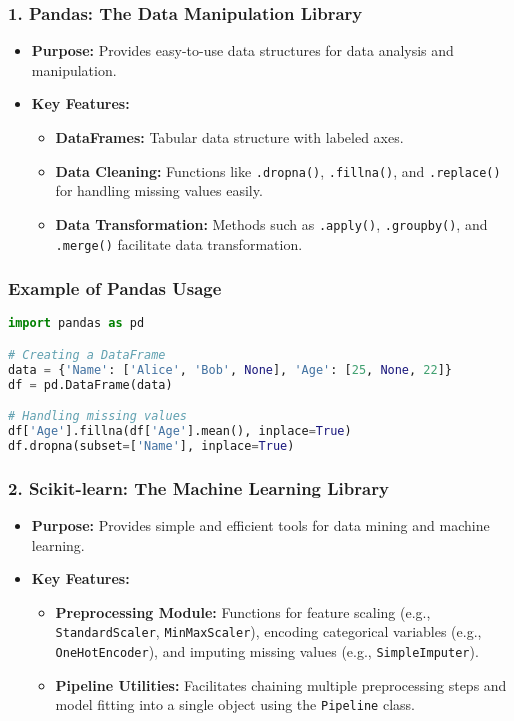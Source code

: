 \documentclass[aspectratio=169]{beamer}
\begin{document}
\begin{frame}
    \frametitle{1. Pandas: The Data Manipulation Library}
    \begin{itemize}
        \item \textbf{Purpose:} Provides easy-to-use data structures for data analysis and manipulation.
        \item \textbf{Key Features:}
        \begin{itemize}
            \item \textbf{DataFrames:} Tabular data structure with labeled axes.
            \item \textbf{Data Cleaning:} Functions like \texttt{.dropna()}, \texttt{.fillna()}, and \texttt{.replace()} for handling missing values easily.
            \item \textbf{Data Transformation:} Methods such as \texttt{.apply()}, \texttt{.groupby()}, and \texttt{.merge()} facilitate data transformation.
        \end{itemize}
    \end{itemize}
\end{frame}

\begin{frame}[fragile]
    \frametitle{Example of Pandas Usage}
    \begin{lstlisting}[language=Python]
import pandas as pd

# Creating a DataFrame
data = {'Name': ['Alice', 'Bob', None], 'Age': [25, None, 22]}
df = pd.DataFrame(data)

# Handling missing values
df['Age'].fillna(df['Age'].mean(), inplace=True)
df.dropna(subset=['Name'], inplace=True)
    \end{lstlisting}
\end{frame}

\begin{frame}
    \frametitle{2. Scikit-learn: The Machine Learning Library}
    \begin{itemize}
        \item \textbf{Purpose:} Provides simple and efficient tools for data mining and machine learning.
        \item \textbf{Key Features:}
        \begin{itemize}
            \item \textbf{Preprocessing Module:} Functions for feature scaling (e.g., \texttt{StandardScaler}, \texttt{MinMaxScaler}), encoding categorical variables (e.g., \texttt{OneHotEncoder}), and imputing missing values (e.g., \texttt{SimpleImputer}).
            \item \textbf{Pipeline Utilities:} Facilitates chaining multiple preprocessing steps and model fitting into a single object using the \texttt{Pipeline} class.
        \end{itemize}
    \end{itemize}
\end{frame}
\end{document}
